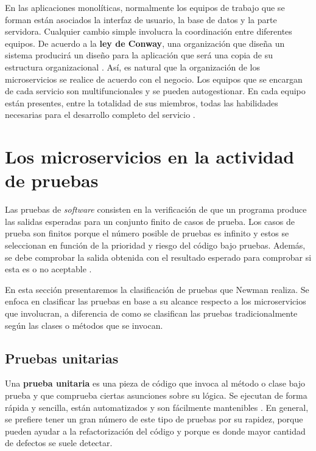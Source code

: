 \documentclass[11pt,spanish,listoffigures]{tfgetsinf}
\begin{document}
En las aplicaciones monolíticas, normalmente los equipos de trabajo que se forman están asociados la interfaz de usuario, la base de datos y la parte servidora. Cualquier cambio simple involucra la coordinación entre diferentes equipos. De acuerdo a la \textbf{ley de Conway}, una organización que diseña un sistema producirá un diseño para la aplicación que será una copia de su estructura organizacional \cite{Conway1968}. Así, es natural que la organización de los microservicios se realice de acuerdo con el negocio. Los equipos que se encargan de cada servicio son multifuncionales y se pueden autogestionar. En cada equipo están presentes, entre la totalidad de sus miembros, todas las habilidades necesarias para el desarrollo completo del servicio \cite{Lewis2014}.

\section{Los microservicios en la actividad de pruebas} \label{sect:FasePruebas}

Las pruebas de \textit{software} consisten en la verificación de que un programa produce las salidas esperadas para un conjunto finito de casos de prueba. Los casos de prueba son finitos porque el número posible de pruebas es infinito y estos se seleccionan en función de la prioridad y riesgo del código bajo pruebas. Además, se debe comprobar la salida obtenida con el resultado esperado para comprobar si esta es o no aceptable \cite{Bourque2014}.

En esta sección presentaremos la clasificación de pruebas que Newman \cite{Newman2015a} realiza. Se enfoca en clasificar las pruebas en base a su alcance respecto a los microservicios que involucran, a diferencia de como se clasifican las pruebas tradicionalmente según las clases o métodos que se invocan.

\subsection{Pruebas unitarias}

Una \textbf{prueba unitaria} es una pieza de código que invoca al método o clase bajo prueba y que comprueba ciertas asunciones sobre su lógica. Se ejecutan de forma rápida y sencilla, están automatizados y son fácilmente mantenibles \cite{Osherove2014}. En general, se prefiere tener un gran número de este tipo de pruebas por su rapidez, porque pueden ayudar a la refactorización del código y porque es donde mayor cantidad de defectos se suele detectar.
\end{document}
